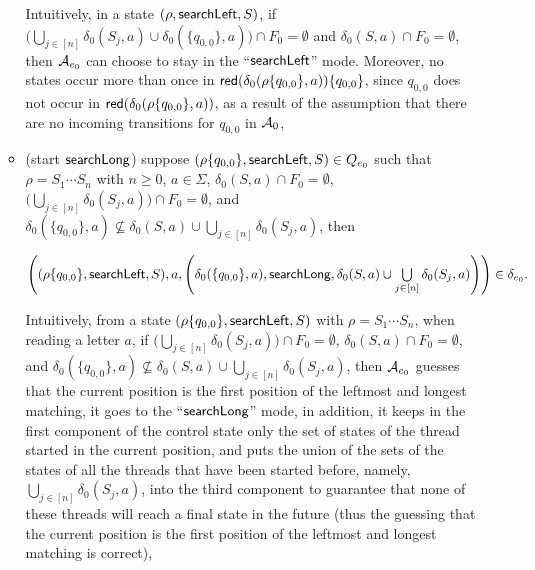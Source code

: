 \begin{itemize}
\begin{itemize}
		\medskip
		 
		Intuitively, in a state $(\rho, \mathsf{searchLeft}, S)$, if $\big(\bigcup \limits_{j \in [n]} \delta_0(S_j, a) \cup \delta_0(\{q_{0,0}\},a)\big) \cap F_0 = \emptyset$ and $\delta_0(S,a) \cap F_0 = \emptyset$, then $\mathcal{A}_{e_0}$ can choose to stay in the ``$\mathsf{searchLeft}$'' mode. 
		Moreover, no states occur more than once in $\mathsf{red}(\delta_0(\rho \{q_{0,0}\}, a)) \{q_{0,0}\}$, since $q_{0,0}$ does not occur in $\mathsf{red}(\delta_0(\rho\{q_{0,0}\}, a))$, as a result of the assumption that there are no incoming transitions for $q_{0,0}$ in $\mathcal{A}_0$,
		\item (start $\mathsf{searchLong}$) suppose $(\rho \{q_{0,0}\}, \mathsf{searchLeft}, S) \in Q_{e_0}$ such that $\rho = S_1 \cdots S_n$ with $n \ge 0$, $a \in \Sigma$, $\delta_0(S,a) \cap F_0 = \emptyset$, $\big(\bigcup \limits_{j \in [n]} \delta_0(S_j, a) \big) \cap F_0 = \emptyset$,  and $\delta_0(\{q_{0,0}\}, a) \not \subseteq \delta_0(S, a) \cup \bigcup \limits_{j \in [n]} \delta_0(S_j, a)$, then
		
		\medskip
		$\left((\rho \{q_{0,0}\}, \mathsf{searchLeft}, S), a, \left(\delta_0(\{q_{0,0}\}, a), \mathsf{searchLong}, \delta_0(S, a) \cup \bigcup \limits_{j \in [n]} \delta_0(S_j, a) \right) \right) \in \delta_{e_0}.$
		
		\medskip
		Intuitively, from a state $(\rho \{q_{0,0}\}, \mathsf{searchLeft}, S)$ with $\rho = S_1 \cdots S_n$, when reading a letter $a$, if $\big(\bigcup \limits_{j \in [n]} \delta_0(S_j, a) \big) \cap F_0 = \emptyset$, $\delta_0(S,a) \cap F_0 = \emptyset$, and $\delta_0(\{q_{0,0}\}, a) \not \subseteq \delta_0(S, a) \cup \bigcup \limits_{j \in [n]} \delta_0(S_j, a)$, then $\mathcal{A}_{e_0}$ guesses that the current position is the first position of the leftmost and longest matching, it goes to the ``$\mathsf{searchLong}$'' mode, in addition, it keeps in the first component of the control state only the set of states of the thread started in the current position, and puts the union of the sets of the states of all the threads that have been started before, namely, $\bigcup \limits_{j \in [n]} \delta_0(S_j, a)$, into the third component to guarantee that none of these threads will reach a final state in the future (thus the guessing that the current position is the first position of the leftmost and longest matching is correct),



\end{itemize}
\end{itemize}
